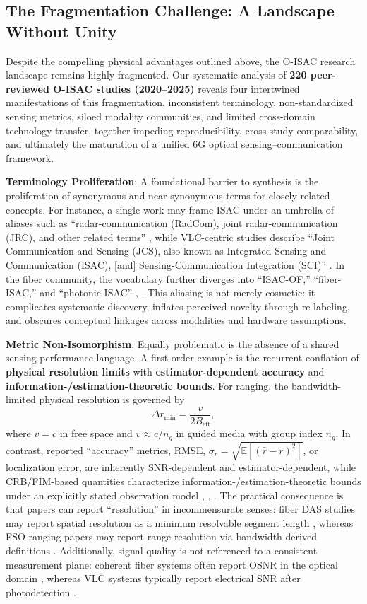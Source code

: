 \subsection{The Fragmentation Challenge: A Landscape Without Unity}

Despite the compelling physical advantages outlined above, the O-ISAC research landscape remains highly fragmented. Our systematic analysis of \textbf{220 peer-reviewed O-ISAC studies (2020--2025)} reveals four intertwined manifestations of this fragmentation, inconsistent terminology, non-standardized sensing metrics, siloed modality communities, and limited cross-domain technology transfer, together impeding reproducibility, cross-study comparability, and ultimately the maturation of a unified 6G optical sensing--communication framework.

\textbf{Terminology Proliferation}: A foundational barrier to synthesis is the proliferation of synonymous and near-synonymous terms for closely related concepts. For instance, a single work may frame ISAC under an umbrella of aliases such as ``radar-communication (RadCom), joint radar-communication (JRC), and other related terms'' \cite{O_ISAC_161}, while VLC-centric studies describe ``Joint Communication and Sensing (JCS), also known as Integrated Sensing and Communication (ISAC), [and] Sensing-Communication Integration (SCI)'' \cite{O_ISAC_068}. In the fiber community, the vocabulary further diverges into ``ISAC-OF,'' ``fiber-ISAC,'' and ``photonic ISAC'' \cite{O_ISAC_041}, \cite{O_ISAC_033}. This aliasing is not merely cosmetic: it complicates systematic discovery, inflates perceived novelty through re-labeling, and obscures conceptual linkages across modalities and hardware assumptions.

\textbf{Metric Non-Isomorphism}: Equally problematic is the absence of a shared sensing-performance language. A first-order example is the recurrent conflation of \textbf{physical resolution limits} with \textbf{estimator-dependent accuracy} and \textbf{information-/estimation-theoretic bounds}. For ranging, the bandwidth-limited physical resolution is governed by
\begin{equation}
\Delta r_{\min} = \frac{v}{2B_{\text{eff}}},
\end{equation}
where $v=c$ in free space and $v \approx c/n_g$ in guided media with group index $n_g$. In contrast, reported ``accuracy'' metrics, RMSE, $\sigma_r = \sqrt{\mathbb{E}[(\hat r-r)^2]}$, or localization error, are inherently SNR-dependent and estimator-dependent, while CRB/FIM-based quantities characterize information-/estimation-theoretic bounds under an explicitly stated observation model \cite{O_ISAC_013}, \cite{O_ISAC_050}, \cite{O_ISAC_056}. The practical consequence is that papers can report ``resolution'' in incommensurate senses: fiber DAS studies may report spatial resolution as a minimum resolvable segment length \cite{O_ISAC_013}, whereas FSO ranging papers may report range resolution via bandwidth-derived definitions \cite{O_ISAC_035}. Additionally, signal quality is not referenced to a consistent measurement plane: coherent fiber systems often report OSNR in the optical domain \cite{O_ISAC_028}, whereas VLC systems typically report electrical SNR after photodetection \cite{O_ISAC_009}.

